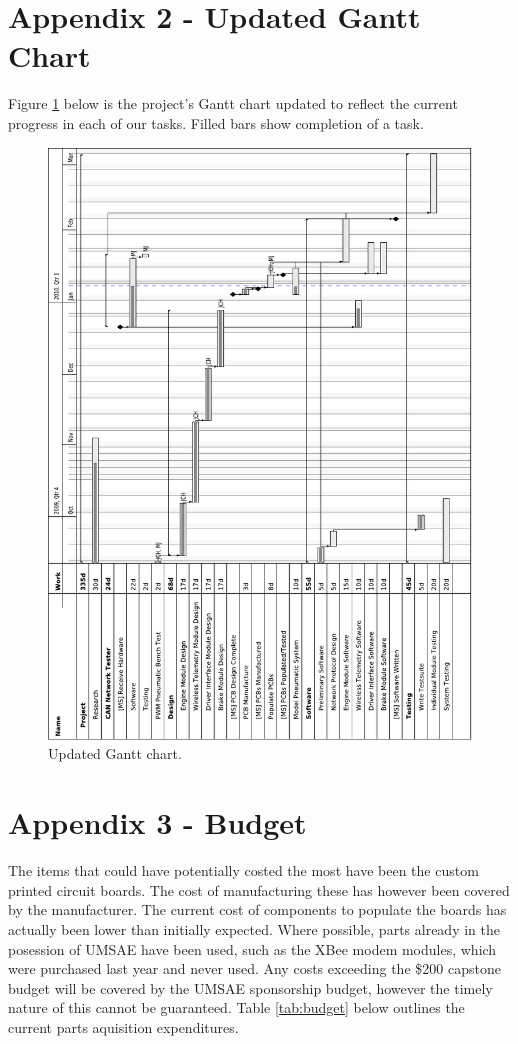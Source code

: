 \documentclass[12pt]{report}
\begin{document}
  \pagebreak

  \section*{Appendix 2 - Updated Gantt Chart}

  Figure \ref{fig:gantt} below is the project's Gantt chart updated to reflect the current progress in each of our tasks. Filled bars show completion of a task.

  \begin{figure}[H]
  \centering{}
    \includegraphics[width=0.75\columnwidth]{gantt_chart.pdf}

  
  \begin{flushleft}
  \caption{Updated Gantt chart.}
  \end{flushleft}

  \label{fig:gantt}
  \end{figure}

  \pagebreak

  \section*{Appendix 3 - Budget}

  The items that could have potentially costed the most have been the custom printed circuit boards. The cost of manufacturing these has however been covered by the manufacturer. The current cost of components to populate the boards has actually been lower than initially expected. Where possible, parts already in the posession of UMSAE have been used, such as the XBee modem modules, which were purchased last year and never used. Any costs exceeding the \$200 capstone budget will be covered by the UMSAE sponsorship budget, however the timely nature of this cannot be guaranteed. Table \ref{tab:budget} below outlines the current parts aquisition expenditures.
\end{document}
